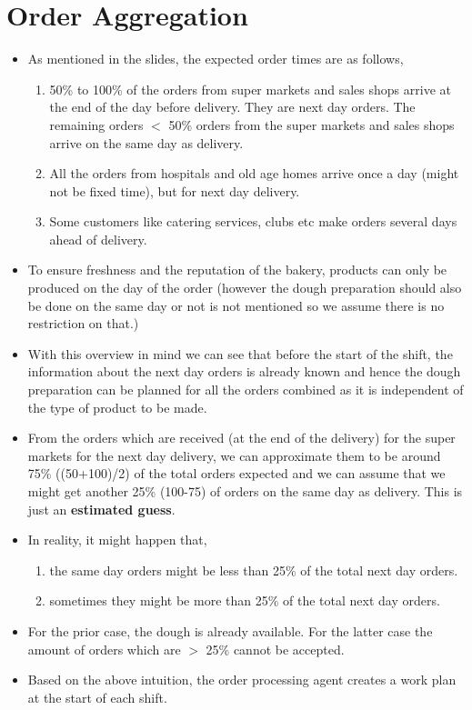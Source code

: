 \documentclass[12pt]{article}
\begin{document}
\section{Order Aggregation}%
\begin{itemize}
    \item As mentioned in the slides, the expected order times are as follows,
    \begin{enumerate}
    	\item 50\% to 100\% of the orders from super markets and sales shops arrive at the end of the day before delivery. They are next day orders. The remaining orders $<$ 50\% orders from the super markets and sales shops arrive on the same day as delivery.
    	\item All the orders from hospitals and old age homes arrive once a day (might not be fixed time), but for next day delivery.
    	\item Some customers like catering services, clubs etc make orders several days ahead of delivery.
    \end{enumerate}
    \item To ensure freshness and the reputation of the bakery, products can only be produced on the day of the order (however the dough preparation should also be done on the same day or not is not mentioned so we assume there is no restriction on that.)
    \item With this overview in mind we can see that before the start of the shift, the information about the next day orders is already known and hence the dough preparation can be planned for all the orders combined as it is independent of the type of product to be made.
    \item From the orders which are received (at the end of the delivery) for the super markets for the next day delivery, we can approximate them to be around 75\% ((50+100)/2) of the total orders expected and we can assume that we might get another 25\% (100-75) of orders on the same day as delivery. This is just an \textbf{estimated guess}. 
    \item In reality, it might happen that,
    \begin{enumerate}
    \item the same day orders might be less than 25\% of the total next day orders. 
    \item sometimes they might be more than 25\% of the total next day orders. 
    \end{enumerate}
    \item For the prior case, the dough is already available. For the latter case the amount of orders which are  $>$ 25\% cannot be accepted.
    \item Based on the above intuition, the order processing agent creates a work plan at the start of each shift. 
\end{itemize}
\end{document}
